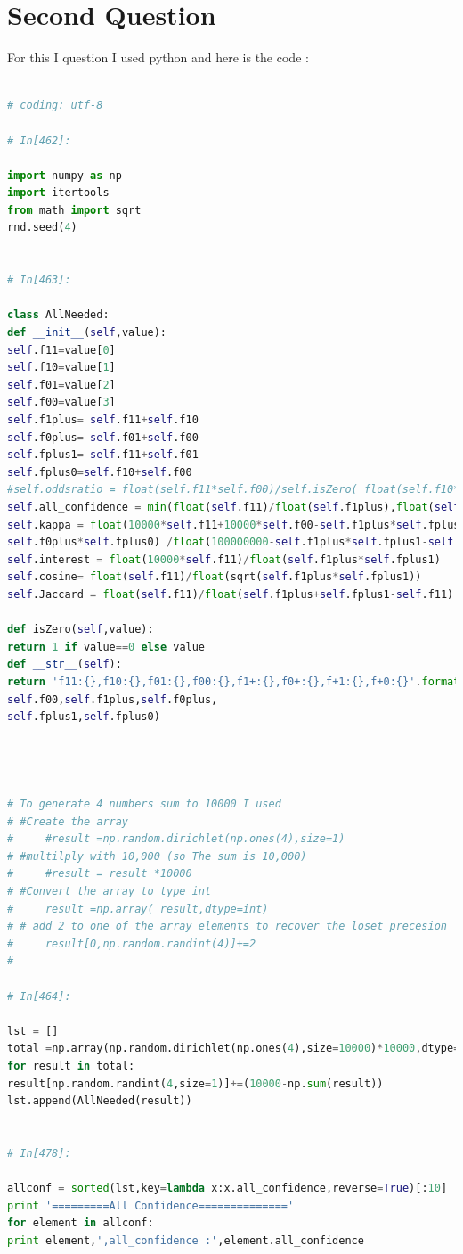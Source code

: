 \documentclass{article}
\begin{document}
	\section*{Second Question}
For this I question I used python and here is the code :
\begin{lstlisting}[language=python]

# coding: utf-8

# In[462]:

import numpy as np
import itertools
from math import sqrt
rnd.seed(4)


# In[463]:

class AllNeeded:
def __init__(self,value):
self.f11=value[0]
self.f10=value[1]
self.f01=value[2]
self.f00=value[3]
self.f1plus= self.f11+self.f10
self.f0plus= self.f01+self.f00
self.fplus1= self.f11+self.f01
self.fplus0=self.f10+self.f00
#self.oddsratio = float(self.f11*self.f00)/self.isZero( float(self.f10*self.f01))
self.all_confidence = min(float(self.f11)/float(self.f1plus),float(self.f11)/float(self.fplus1))
self.kappa = float(10000*self.f11+10000*self.f00-self.f1plus*self.fplus1-
self.f0plus*self.fplus0) /float(100000000-self.f1plus*self.fplus1-self.f0plus*self.fplus0)
self.interest = float(10000*self.f11)/float(self.f1plus*self.fplus1)
self.cosine= float(self.f11)/float(sqrt(self.f1plus*self.fplus1))
self.Jaccard = float(self.f11)/float(self.f1plus+self.fplus1-self.f11)

def isZero(self,value):
return 1 if value==0 else value
def __str__(self):
return 'f11:{},f10:{},f01:{},f00:{},f1+:{},f0+:{},f+1:{},f+0:{}'.format(self.f11,self.f10,self.f01,
self.f00,self.f1plus,self.f0plus,
self.fplus1,self.fplus0)




# To generate 4 numbers sum to 10000 I used 
# #Create the array
#     #result =np.random.dirichlet(np.ones(4),size=1)
# #multilply with 10,000 (so The sum is 10,000)
#     #result = result *10000
# #Convert the array to type int
#     result =np.array( result,dtype=int)
# # add 2 to one of the array elements to recover the loset precesion
#     result[0,np.random.randint(4)]+=2
#     

# In[464]:

lst = []
total =np.array(np.random.dirichlet(np.ones(4),size=10000)*10000,dtype=int)
for result in total:
result[np.random.randint(4,size=1)]+=(10000-np.sum(result))
lst.append(AllNeeded(result))


# In[478]:

allconf = sorted(lst,key=lambda x:x.all_confidence,reverse=True)[:10]
print '=========All Confidence=============='
for element in allconf:
print element,',all_confidence :',element.all_confidence


\end{lstlisting}
\end{document}
